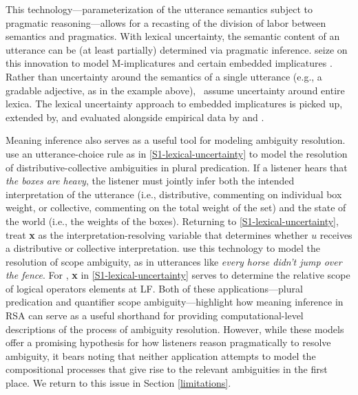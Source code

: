 \documentclass[10pt,letterpaper]{article}
\begin{document}
This technology---parameterization of the utterance semantics subject to pragmatic reasoning---allows for a recasting of the division of labor between semantics and pragmatics. With lexical uncertainty, the semantic content of an utterance can be (at least partially) determined via pragmatic inference. \cite{bergenetal2016} seize on this innovation to model M-implicatures \cite{horn1984} and certain embedded implicatures \cite{hurford1974,chierchiaetal2012}. Rather than uncertainty around the semantics of a single utterance (e.g., a gradable adjective, as in the example above), \cite{bergenetal2016}~assume uncertainty around entire lexica.
The lexical uncertainty approach to embedded implicatures is picked up, extended by, and evaluated alongside empirical data by \cite{PottsLassiter2016:Embedded-implic} and \cite{FrankeBergen2020:Theory-driven-s}.

Meaning inference also serves as a useful tool for modeling ambiguity resolution. \cite{scontrasgoodman2017} use an utterance-choice rule as in \eqref{S1-lexical-uncertainty} to model the resolution of distributive-collective ambiguities in plural predication. If a listener hears that \emph{the boxes are heavy}, the listener must jointly infer both the intended interpretation of the utterance (i.e., distributive, commenting on individual box weight, or collective, commenting on the total weight of the set) and the state of the world (i.e., the weights of the boxes). Returning to \eqref{S1-lexical-uncertainty}, \cite{scontrasgoodman2017} treat \textbf{x} as the interpretation-resolving variable that determines whether $u$ receives a distributive or collective interpretation. \cite{savinellietal2017,savinellietal2018} use this technology to model the resolution of scope ambiguity, as in utterances like \emph{every horse didn't jump over the fence}. For \cite{savinellietal2017}, \textbf{x} in \eqref{S1-lexical-uncertainty} serves to determine the relative scope of logical operators elements at LF. 
Both of these applications---plural predication and quantifier scope ambiguity---highlight how meaning inference in RSA can serve as a useful shorthand for providing computational-level descriptions of the process of ambiguity resolution. However, while these models offer a promising hypothesis for how listeners reason pragmatically to resolve ambiguity, it bears noting that neither application attempts to model the compositional processes that give rise to the relevant ambiguities in the first place. We return to this issue in Section \ref{limitations}.
\end{document}
